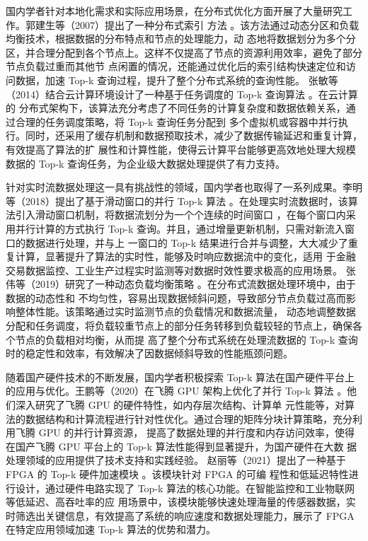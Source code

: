 国内学者针对本地化需求和实际应用场景，在分布式优化方面开展了大量研究工作。郭建生等（2007）提出了一种分布式索引
方法 \cite {guo2007}。该方法通过动态分区和负载均衡技术，根据数据的分布特点和节点的处理能力，动
态地将数据划分为多个分区，并合理分配到各个节点上。这样不仅提高了节点的资源利用效率，避免了部分节点负载过重而其他节
点闲置的情况，还能通过优化后的索引结构快速定位和访问数据，加速 Top-k 查询过程，提升了整个分布式系统的查询性能。
张敏等（2014）结合云计算环境设计了一种基于任务调度的 Top-k 查询算法 \cite {zhang2014}。在云计算的
分布式架构下，该算法充分考虑了不同任务的计算复杂度和数据依赖关系，通过合理的任务调度策略，将 Top-k 查询任务分配到
多个虚拟机或容器中并行执行。同时，还采用了缓存机制和数据预取技术，减少了数据传输延迟和重复计算，有效提高了算法的扩
展性和计算性能，使得云计算平台能够更高效地处理大规模数据的 Top-k 查询任务，为企业级大数据处理提供了有力支持。

针对实时流数据处理这一具有挑战性的领域，国内学者也取得了一系列成果。李明等（2018）提出了基于滑动窗口的并行 Top-k
 算法 \cite {li2018}。在处理实时流数据时，该算法引入滑动窗口机制，将数据流划分为一个个连续的时间窗口
 ，在每个窗口内采用并行计算的方式执行 Top-k 查询。并且，通过增量更新机制，只需对新流入窗口的数据进行处理，并与上
 一窗口的 Top-k 结果进行合并与调整，大大减少了重复计算，显著提升了算法的实时性，能够及时响应数据流中的变化，适用
 于金融交易数据监控、工业生产过程实时监测等对数据时效性要求极高的应用场景。
张伟等（2019）研究了一种动态负载均衡策略 \cite {zhang2019}。在分布式流数据处理环境中，由于数据的动态性和
不均匀性，容易出现数据倾斜问题，导致部分节点负载过高而影响整体性能。该策略通过实时监测节点的负载情况和数据流量，
动态地调整数据分配和任务调度，将负载较重节点上的部分任务转移到负载较轻的节点上，确保各个节点的负载相对均衡，从而提
高了整个分布式系统在处理流数据的 Top-k 查询时的稳定性和效率，有效解决了因数据倾斜导致的性能瓶颈问题。

随着国产硬件技术的不断发展，国内学者积极探索 Top-k 算法在国产硬件平台上的应用与优化。王鹏等（2020）在飞腾 GPU 
架构上优化了并行 Top-k 算法 \cite {wang2020}。他们深入研究了飞腾 GPU 的硬件特性，如内存层次结构、计算单
元性能等，对算法的数据结构和计算流程进行针对性优化。通过合理的矩阵分块计算策略，充分利用飞腾 GPU 的并行计算资源，
提高了数据处理的并行度和内存访问效率，使得在国产飞腾 GPU 平台上的 Top-k 算法性能得到显著提升，为国产硬件在大数
据处理领域的应用提供了技术支持和实践经验。
赵丽等（2021）提出了一种基于 FPGA 的 Top-k 硬件加速模块 \cite {Zhao2021}。该模块针对 FPGA 的可编
程性和低延迟特性进行设计，通过硬件电路实现了 Top-k 算法的核心功能。在智能监控和工业物联网等低延迟、高吞吐率的应
用场景中，该模块能够快速处理海量的传感器数据，实时筛选出关键信息，有效提高了系统的响应速度和数据处理能力，展示了 
FPGA 在特定应用领域加速 Top-k 算法的优势和潜力。

